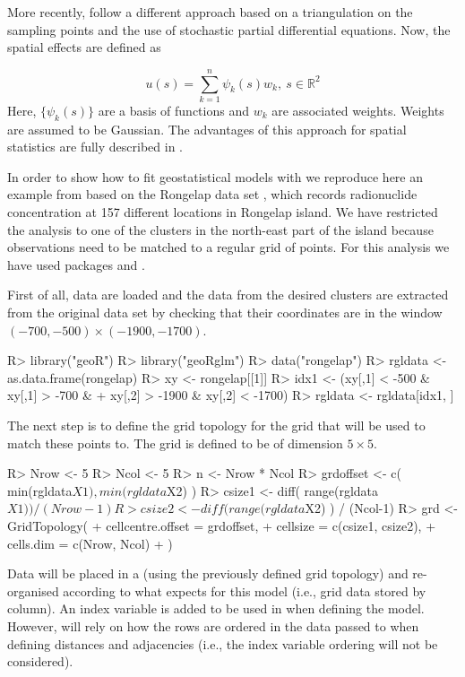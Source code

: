 \documentclass[article]{jss}
\begin{document}
More recently, \citet{Lindgren:2011} follow a different approach based on
a triangulation on the sampling points and the use of stochastic partial
differential equations. Now, the spatial effects are defined as

\begin{equation}
u(s)=\sum_{k=1}^n \psi_k(s)w_k,\ s\in \mathbb{R}^2
\end{equation}
\noindent
Here, $\{\psi_k(s)\}$ are a basis of functions and $w_k$ are associated
weights. Weights are assumed to be Gaussian. The advantages of this approach
for spatial statistics are fully described in \citet{Camelettietal:2013}.


In order to show how to fit geostatistical models with  we
reproduce here an example from \citet{GomezRubioetal:2013} based on the
Rongelap data set \citep{DiggleRibeiro:2007}, which records  radionuclide
concentration at 157 different locations in Rongelap island. We have restricted
the analysis to one of the clusters in the north-east part of the island
because observations need to be matched to a regular grid of points.  For this
analysis we have used  packages  \citep{geoR:2001} and
 \citep{geoRglm:2002}.



First of all, data are loaded and the data from the desired clusters
are extracted from the original data set by checking that their coordinates
are in the window $(-700, -500)\times (-1900, -1700)$.

\begin{Schunk}
\begin{Sinput}
R> library("geoR")
R> library("geoRglm")
R> data("rongelap")
R> rgldata <- as.data.frame(rongelap)
R> xy <- rongelap[[1]]
R> idx1 <- (xy[,1] < -500 & xy[,1] > -700 & 
+     xy[,2] > -1900 & xy[,2] < -1700)
R> rgldata <- rgldata[idx1, ]
\end{Sinput}
\end{Schunk}


The next step is to  define the grid topology for the grid that will be
used to match these points to. The grid is defined to be of dimension 
$5\times 5$. 

\begin{Schunk}
\begin{Sinput}
R> Nrow <- 5
R> Ncol <- 5
R> n <- Nrow * Ncol
R> grdoffset <- c( min(rgldata$X1), min(rgldata$X2) )
R> csize1 <- diff( range(rgldata$X1) ) / (Nrow-1)
R> csize2 <- diff( range(rgldata$X2) ) / (Ncol-1)
R> grd <- GridTopology(
+     cellcentre.offset = grdoffset, 
+     cellsize = c(csize1, csize2),
+     cells.dim = c(Nrow, Ncol)
+  )
\end{Sinput}
\end{Schunk}
\noindent
Data will be placed in a  (using the previously
defined grid topology) and re-organised according to what  expects
for this model (i.e., grid data stored by column).  An index variable 
is added to be used in  when defining the model. However, 
 will rely on how the rows are ordered in the data passed to 
 when defining distances and adjacencies (i.e., the index
variable ordering will not be considered).
\end{document}
